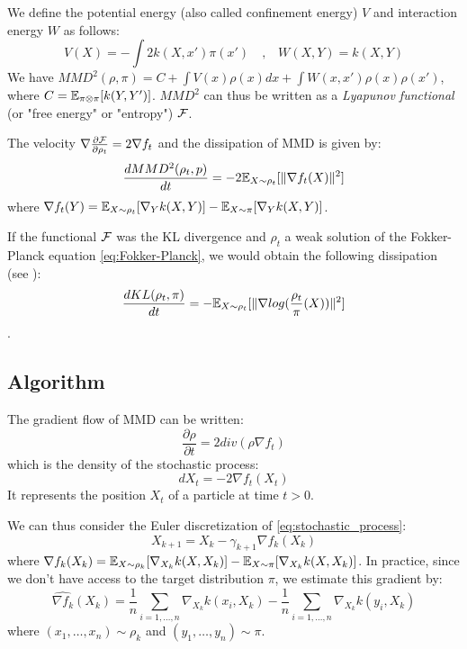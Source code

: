 We define the potential energy (also called confinement energy) $V$ and interaction energy $W$ as follows:
\begin{equation}
V(X)=-\int 2 k(X,x')\pi(x') \quad \text{,} \quad
W(X,Y)=k(X,Y)
\end{equation}
We have $MMD^2(\rho,\pi)=C+ \int V(x) \rho(x)dx + \int W(x,x')\rho(x)\rho(x')$, where $C={{\mathbb E}}_{\pi\otimes \pi}[k(Y,Y')]$. $MMD^2$ can thus be written as a \textit{Lyapunov functional} (or "free energy" or "entropy") ${{\mathcal F}}$.


\begin{proposition}\label{prop:mmd_flow}
 The velocity $\nabla \frac{\partial{{{\mathcal F}}}}{\partial{\rho_t}}=2 \nabla f_t$ and the dissipation of MMD is given by:  
	\begin{equation}
	\frac{d MMD^2(\rho_t, p)}{dt}=-2 {{\mathbb E}}_{X \sim \rho_t}[\|\nabla f_t(X)\|^2]
	\end{equation}
	where $\nabla f_t(Y)= {{\mathbb E}}_{X \sim \rho_t}[\nabla_{Y}k(X,Y)] -  {{\mathbb E}}_{X \sim \pi}[\nabla_{Y}k(X,Y)]$.
\end{proposition}

\begin{remark}
	If the functional ${{\mathcal F}}$ was the KL divergence and $\rho_t$ a weak solution of the Fokker-Planck equation \eqref{eq:Fokker-Planck}, we would obtain the following dissipation (see \cite{wibisono2018sampling}):
	\begin{equation}
	\frac{d KL(\rho_t, \pi)}{dt}=-{{\mathbb E}}_{X \sim \rho_t}[\|\nabla log(\frac{\rho_t}{\pi}(X))\|^2]
	\end{equation}.
\end{remark}




\subsection{Algorithm}

The gradient flow of MMD can be written:
\begin{equation*}
\frac{\partial \rho}{\partial t}= 2 div(\rho  \nabla f_t)
\end{equation*}
which is the density of the stochastic process:
\begin{equation}\label{eq:stochastic_process}
dX_t=-2\nabla f_t(X_t) 
\end{equation}
It represents the position $X_t$ of a particle at time $t > 0$.


We can thus consider the Euler discretization of \eqref{eq:stochastic_process}:
\begin{equation}\label{eq:discretization}
X_{k+1}=X_k - \gamma_{k+1} \nabla f_k(X_k)
\end{equation}
where $\nabla f_k(X_k)= {{\mathbb E}}_{X \sim \rho_k}[\nabla_{X_k}k(X,X_k)] -  {{\mathbb E}}_{X \sim \pi}[\nabla_{X_k}k(X,X_k)]$.
In practice, since we don't have access to the target distribution $\pi$, we estimate this gradient by:
\begin{equation*}
\widehat{\nabla f_k}(X_k)=\frac{1}{n}\sum_{i=1,\dots,n}\nabla_{X_k}k(x_i,X_k) - \frac{1}{n}\sum_{i=1,\dots,n}\nabla_{X_k}k(y_i,X_k)
\end{equation*}
where $(x_1, \dots, x_n)\sim \rho_k$ and $(y_1, \dots, y_n)\sim \pi$.



